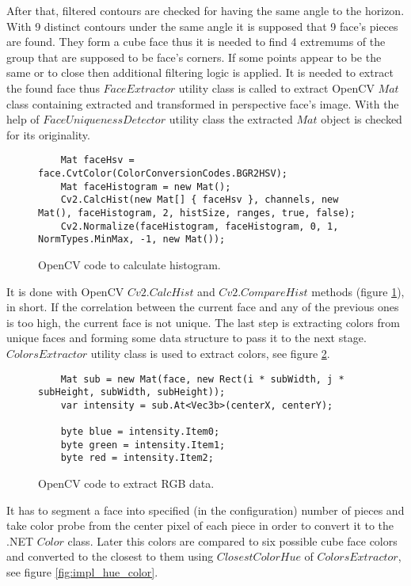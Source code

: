 \documentclass[../../main.tex]{subfiles}
\begin{document}
After that, filtered contours are checked for having the same angle to the horizon. With 9 distinct contours under the same angle it is supposed that 9 face's pieces are found. They form a cube face thus it is needed to find 4 extremums of the group that are supposed to be face's corners. If some points appear to be the same or to close then additional filtering logic is applied. It is needed to extract the found face thus $FaceExtractor$ utility class is called to extract \ac{OpenCV} $Mat$ class containing extracted and transformed in perspective face's image. With the help of $FaceUniquenessDetector$ utility class the extracted $Mat$ object is checked for its originality. 
 
\begin{figure} [!ht]
\centering    
\lstset{style=sharpc}
    \begin{lstlisting}
    Mat faceHsv = face.CvtColor(ColorConversionCodes.BGR2HSV);
    Mat faceHistogram = new Mat();
    Cv2.CalcHist(new Mat[] { faceHsv }, channels, new Mat(), faceHistogram, 2, histSize, ranges, true, false);
    Cv2.Normalize(faceHistogram, faceHistogram, 0, 1, NormTypes.MinMax, -1, new Mat());
    \end{lstlisting}
\caption{OpenCV code to calculate histogram.}
\label{fig:impl_fcalc_hist}
\end{figure}
 
It is done with \ac{OpenCV} $Cv2.CalcHist$ and $Cv2.CompareHist$ methods (figure \ref{fig:impl_fcalc_hist}), in short. If the correlation between the current face and any of the previous ones is too high, the current face is not unique. The last step is extracting colors from unique faces and forming some data structure to pass it to the next stage. $ColorsExtractor$ utility class is used to extract colors, see figure \ref{fig:impl_extract_color}. 

\begin{figure} [!ht]
\centering    
\lstset{style=sharpc}
    \begin{lstlisting}
    Mat sub = new Mat(face, new Rect(i * subWidth, j * subHeight, subWidth, subHeight));
    var intensity = sub.At<Vec3b>(centerX, centerY);

    byte blue = intensity.Item0;
    byte green = intensity.Item1;
    byte red = intensity.Item2;        
    \end{lstlisting}
\caption{OpenCV code to extract RGB data.}
\label{fig:impl_extract_color}
\end{figure}

It has to segment a face into specified (in the configuration) number of pieces and take color probe from the center pixel of each piece in order to convert it to the .NET $Color$ class. Later this colors are compared to six possible cube face colors and converted to the closest to them using $ClosestColorHue$ of $ColorsExtractor$, see figure \ref{fig:impl_hue_color}. 
\end{document}
